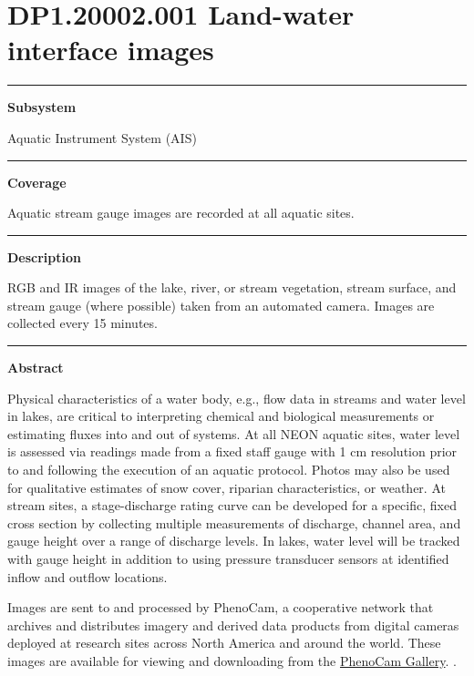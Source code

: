 \documentclass[]{article}
\begin{document}
\section{DP1.20002.001 Land-water interface
images}\label{dp1.20002.001-land-water-interface-images}

\begin{center}\rule{0.5\linewidth}{\linethickness}\end{center}

\textbf{Subsystem}

Aquatic Instrument System (AIS)

\begin{center}\rule{0.5\linewidth}{\linethickness}\end{center}

\textbf{Coverage}

Aquatic stream gauge images are recorded at all aquatic sites.

\begin{center}\rule{0.5\linewidth}{\linethickness}\end{center}

\textbf{Description}

RGB and IR images of the lake, river, or stream vegetation, stream
surface, and stream gauge (where possible) taken from an automated
camera. Images are collected every 15 minutes.

\begin{center}\rule{0.5\linewidth}{\linethickness}\end{center}

\textbf{Abstract}

Physical characteristics of a water body, e.g., flow data in streams and
water level in lakes, are critical to interpreting chemical and
biological measurements or estimating fluxes into and out of systems. At
all NEON aquatic sites, water level is assessed via readings made from a
fixed staff gauge with 1 cm resolution prior to and following the
execution of an aquatic protocol. Photos may also be used for
qualitative estimates of snow cover, riparian characteristics, or
weather. At stream sites, a stage-discharge rating curve can be
developed for a specific, fixed cross section by collecting multiple
measurements of discharge, channel area, and gauge height over a range
of discharge levels. In lakes, water level will be tracked with gauge
height in addition to using pressure transducer sensors at identified
inflow and outflow locations.

Images are sent to and processed by PhenoCam, a cooperative network that
archives and distributes imagery and derived data products from digital
cameras deployed at research sites across North America and around the
world. These images are available for viewing and downloading from the
\href{https://phenocam.sr.unh.edu}{PhenoCam Gallery}. \newpage
.
\end{document}
